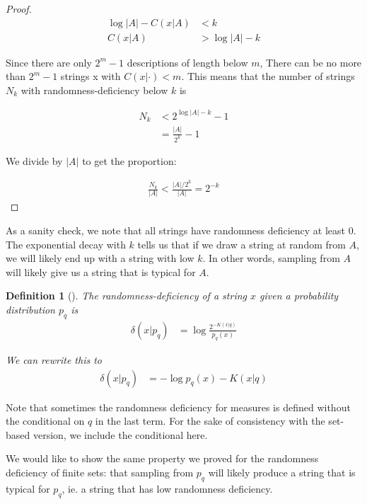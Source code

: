 \documentclass[10pt,a4paper,oneside]{article}
\newtheorem{dfn}{Definition}
\begin{document}
\begin{proof}
\begin{align*}
\log |A| - C(x|A) &< k \\
C(x|A) &> \log |A| - k 
\end{align*}

Since there are only $2^m-1$ descriptions of length below $m$, There can be no more than $2^m-1$ strings x with $C(x|\cdot) < m$. This means that the number of strings $N_k$ with randomness-deficiency below $k$ is

\begin{align*}
N_k &< 2^{\log |A| - k}-1 \\
&= \frac{|A|}{2^k} - 1
\end{align*}

We divide by $|A|$ to get the proportion: 

\begin{align*}
\frac{N_k}{|A|} < \frac{|A|/2^k}{|A|} =  2^{-k}
\end{align*}
\end{proof}

As a sanity check, we note that all strings have randomness deficiency at least $0$. The exponential decay with $k$ tells us that if we draw a string at random from $A$, we will likely end up with a string with low $k$. In other words, sampling from $A$ will likely give us a string that is typical for $A$.

\begin{dfn}[{\cite{antunes2009depth}}]
The randomness-deficiency of a string $x$ given a probability distribution $p_q$ is 
\begin{align*}
\delta(x|p_q) &= \log \frac{2^{-K(x|q)}}{p_q(x)}
\end{align*} 

We can rewrite this to 
\begin{align*}
\delta(x|p_q) &= - \log p_q(x) - K(x|q) 
\end{align*}
\end{dfn}

Note that sometimes the randomness deficiency for measures is defined without the conditional on $q$ in the last term. For the sake of consistency with the set-based version, we include the conditional here.

We would like to show the same property we proved for the randomness deficiency of finite sets: that sampling from $p_q$ will likely produce a string that is typical for $p_q$, ie. a string that has low randomness deficiency.
\end{document}
